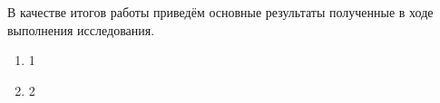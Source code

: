 %

В качестве итогов работы приведём основные результаты полученные в ходе выполнения исследования.

\begin{enumerate}
    \item 1
    \item 2
\end{enumerate}

%
%
%

\clearpage
